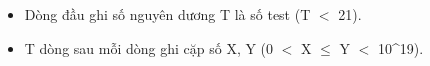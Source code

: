 \begin{itemize}
	\item     Dòng đầu ghi số nguyên dương T là số test (T $<$ 21).   
	\item     T dòng sau mỗi dòng ghi cặp số X, Y (0 $<$ X  $\le$  Y $<$ 10^19).   
\end{itemize}